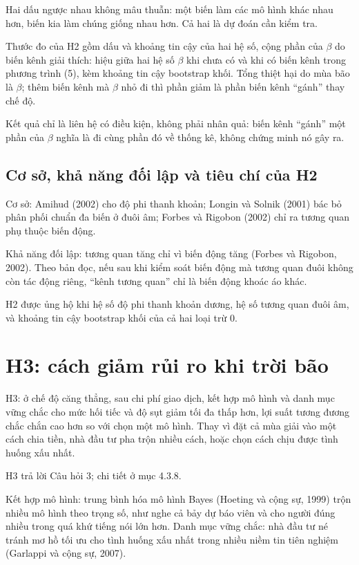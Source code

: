 Hai dấu ngược nhau không mâu thuẫn: một biến làm các mô hình khác nhau hơn, biến kia làm chúng giống nhau hơn. Cả hai là dự đoán cần kiểm tra.

Thước đo của H2 gồm dấu và khoảng tin cậy của hai hệ số, cộng phần của \(\beta\) do biến kênh giải thích: hiệu giữa hai hệ số \(\beta\) khi chưa có và khi có biến kênh trong phương trình (5), kèm khoảng tin cậy bootstrap khối. Tổng thiệt hại do mùa bão là \(\beta\); thêm biến kênh mà \(\beta\) nhỏ đi thì phần giảm là phần biến kênh “gánh” thay chế độ.

Kết quả chỉ là liên hệ có điều kiện, không phải nhân quả: biến kênh “gánh” một phần của \(\beta\) nghĩa là đi cùng phần đó về thống kê, không chứng minh nó gây ra.

\subsection{Cơ sở, khả năng đối lập và tiêu chí của H2}

Cơ sở: Amihud (2002) cho độ phi thanh khoản; Longin và Solnik (2001) bác bỏ phân phối chuẩn đa biến ở đuôi âm; Forbes và Rigobon (2002) chỉ ra tương quan phụ thuộc biến động.

Khả năng đối lập: tương quan tăng chỉ vì biến động tăng (Forbes và Rigobon, 2002). Theo bản đọc, nếu sau khi kiểm soát biến động mà tương quan đuôi không còn tác động riêng, “kênh tương quan” chỉ là biến động khoác áo khác.

H2 được ủng hộ khi hệ số độ phi thanh khoản dương, hệ số tương quan đuôi âm, và khoảng tin cậy bootstrap khối của cả hai loại trừ 0.

\section{H3: cách giảm rủi ro khi trời bão}

H3: ở chế độ căng thẳng, sau chi phí giao dịch, kết hợp mô hình và danh mục vững chắc cho mức hối tiếc và độ sụt giảm tối đa thấp hơn, lợi suất tương đương chắc chắn cao hơn so với chọn một mô hình. Thay vì đặt cả mùa giải vào một cách chia tiền, nhà đầu tư pha trộn nhiều cách, hoặc chọn cách chịu được tình huống xấu nhất.

H3 trả lời Câu hỏi 3; chi tiết ở mục 4.3.8.

Kết hợp mô hình: trung bình hóa mô hình Bayes (Hoeting và cộng sự, 1999) trộn nhiều mô hình theo trọng số, như nghe cả bảy dự báo viên và cho người đúng nhiều trong quá khứ tiếng nói lớn hơn. Danh mục vững chắc: nhà đầu tư né tránh mơ hồ tối ưu cho tình huống xấu nhất trong nhiều niềm tin tiên nghiệm (Garlappi và cộng sự, 2007).

